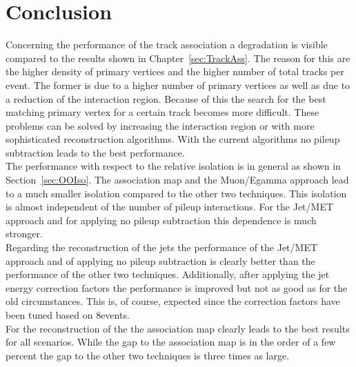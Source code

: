 \section{Conclusion}

Concerning the performance of the track association a degradation is visible compared to the results shown in Chapter~\ref{sec:TrackAss}. The reason for this are the higher density of primary vertices and the higher number of total tracks per event. The former is due to a higher number of primary vertices as well as due to a reduction of the interaction region. Because of this the search for the best matching primary vertex for a certain track becomes more difficult. These problems can be solved by increasing the interaction region or with more sophisticated reconstruction algorithms. With the current algorithms no pileup subtraction leads to the best performance. \\
The performance with respect to the relative isolation is in general as shown in Section~\ref{sec:OOIso}. The association map and the Muon/Egamma approach lead to a much smaller isolation compared to the other two techniques. This isolation is almost independent of the number of pileup interactions. For the Jet/MET approach and for applying no pileup subtraction this dependence is much stronger. \\
Regarding the reconstruction of the jets the performance of the Jet/MET approach and of applying no pileup subtraction is clearly better than the performance of the other two techniques. Additionally, after applying the jet energy correction factors the performance is improved but not as good as for the old circumstances. This is, of course, expected since the correction factors have been tuned based on 8\TeV events. \\
For the reconstruction of the \MET{} the association map clearly leads to the best results for all scenarios. While the gap to the association map is in the order of a few percent the gap to the other two techniques is three times as large.
